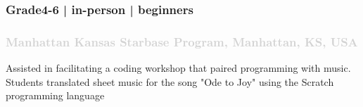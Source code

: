 \documentclass[11pt]{article}
\begin{document}
 \subsubsection{ Grade4-6 | in-person | beginners   }
  \subsubsection{ \textcolor{lightgray}{\normalfont Manhattan Kansas Starbase Program, Manhattan, KS, USA   }}
 \vspace{0.2em} %
  \noindent Assisted in facilitating a coding workshop that paired programming with music. Students translated sheet music for the song "Ode to Joy" using the Scratch programming language
\vspace{0.8em} %
\end{document}
